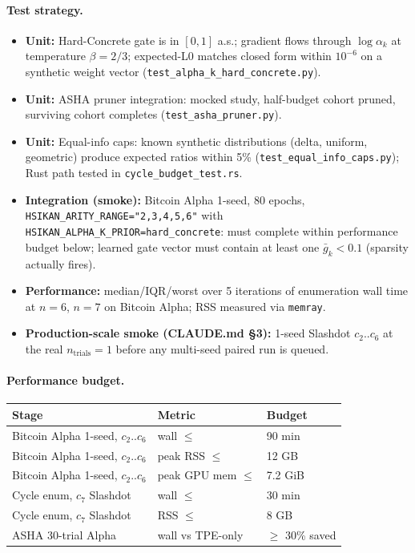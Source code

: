 \documentclass{article}
\begin{document}
\paragraph{Test strategy.}
\begin{itemize}
  \item \textbf{Unit:} Hard-Concrete gate is in $[0,1]$ a.s.; gradient
    flows through $\log\alpha_k$ at temperature $\beta=2/3$;
    expected-L0 matches closed form within $10^{-6}$ on a synthetic
    weight vector (\texttt{test\_alpha\_k\_hard\_concrete.py}).
  \item \textbf{Unit:} ASHA pruner integration: mocked study,
    half-budget cohort pruned, surviving cohort completes
    (\texttt{test\_asha\_pruner.py}).
  \item \textbf{Unit:} Equal-info caps: known synthetic distributions
    (delta, uniform, geometric) produce expected ratios within 5\%
    (\texttt{test\_equal\_info\_caps.py}); Rust path tested in
    \texttt{cycle\_budget\_test.rs}.
  \item \textbf{Integration (smoke):} Bitcoin Alpha 1-seed, 80 epochs,
    \texttt{HSIKAN\_ARITY\_RANGE="2,3,4,5,6"} with
    \texttt{HSIKAN\_ALPHA\_K\_PRIOR=hard\_concrete}: must complete
    within performance budget below; learned gate vector must contain
    at least one $\bar g_k < 0.1$ (sparsity actually fires).
  \item \textbf{Performance:} median/IQR/worst over 5 iterations of
    enumeration wall time at $n=6$, $n=7$ on Bitcoin Alpha; RSS
    measured via \texttt{memray}.
  \item \textbf{Production-scale smoke (CLAUDE.md \S3):}
    1-seed Slashdot $c_2..c_6$ at the real $n_{\text{trials}}=1$ before
    any multi-seed paired run is queued.
\end{itemize}

\paragraph{Performance budget.}
\begin{tabular}{lll}
\toprule
Stage & Metric & Budget \\
\midrule
Bitcoin Alpha 1-seed, $c_2..c_6$ & wall $\leq$ & 90 min \\
Bitcoin Alpha 1-seed, $c_2..c_6$ & peak RSS $\leq$ & 12 GB \\
Bitcoin Alpha 1-seed, $c_2..c_6$ & peak GPU mem $\leq$ & 7.2 GiB \\
Cycle enum, $c_7$ Slashdot & wall $\leq$ & 30 min \\
Cycle enum, $c_7$ Slashdot & RSS $\leq$ & 8 GB \\
ASHA 30-trial Alpha & wall vs TPE-only & $\geq$ 30\% saved \\
\bottomrule
\end{tabular}
\end{document}
